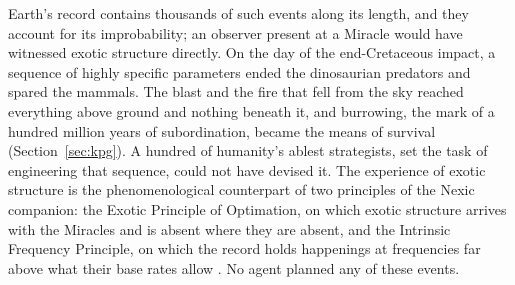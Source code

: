 Earth's record contains thousands of such events along its length, and they
account for its improbability; an observer present at a Miracle would have
witnessed exotic structure directly. On the day of the end-Cretaceous
impact, a sequence of highly specific parameters ended the dinosaurian
predators and spared the mammals. The blast and the fire that fell from the
sky reached everything above ground and nothing beneath it, and burrowing,
the mark of a hundred million years of subordination, became the means of
survival (Section~\ref{sec:kpg}). A hundred of humanity's ablest
strategists, set the task of engineering that sequence, could not have
devised it. The experience of exotic structure is the phenomenological
counterpart of two principles of the Nexic companion: the Exotic Principle
of Optimation, on which exotic structure arrives with the Miracles and is
absent where they are absent, and the Intrinsic Frequency Principle, on
which the record holds happenings at frequencies far above what their base
rates allow \cite{Nexus}. No agent planned any of these events.
